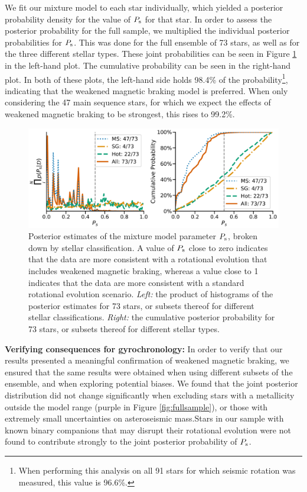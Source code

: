 \documentclass[12pt]{article}
\begin{document}
We fit our mixture model to each star individually, which yielded a posterior probability density for the value of $P_{\rm s}$ for that star. In order to assess the posterior probability for the full sample, we multiplied the individual posterior probabilities for $P_{\rm s}$. This was done for the full ensemble of 73 stars, as well as for the three different stellar types. These joint probabilities can be seen in Figure \ref{fig:gyroresults} in the left-hand plot. The cumulative probability can be seen in the right-hand plot. In both of these plots, the left-hand side holds 98.4\% of the probability\footnote{When performing this analysis on all 91 stars for which seismic rotation was measured, this value is 96.6\%.}, indicating that the weakened magnetic braking model is preferred. When only considering the 47 main sequence stars, for which we expect the effects of weakened magnetic braking to be strongest, this rises to 99.2\%. \\

\begin{figure}
	\centering
	\includegraphics[width=\textwidth]{modelresults.pdf}
	\caption{Posterior estimates of the mixture model parameter $P_{\rm s}$, broken down by stellar classification. A value of $P_{\rm s}$ close to zero indicates that the data are more consistent with a rotational evolution that includes weakened magnetic braking, whereas a value close to 1 indicates that the data are more consistent with a standard rotational evolution scenario. \textit{Left:} the product of histograms of the posterior estimates for 73 stars, or subsets thereof for different stellar classifications. \textit{Right:} the cumulative posterior probability for 73 stars, or subsets thereof for different stellar types.}
	\label{fig:gyroresults}
\end{figure}

\textbf{Verifying consequences for gyrochronology:} In order to verify that our results presented a meaningful confirmation of weakened magnetic braking, we ensured that the same results were obtained when using different subsets of the ensemble, and when exploring potential biases. We found that the joint posterior distribution did not change significantly when excluding stars with a metallicity outside the model range (purple in Figure \ref{fig:fullsample}), or those with extremely small uncertainties on asteroseismic mass.Stars in our sample with known binary companions that may disrupt their rotational evolution were not found to contribute strongly to the joint posterior probability of $P_{\rm s}$. 
\end{document}
